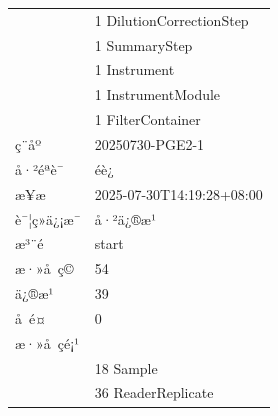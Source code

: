 \documentclass[UTF8,10pt,a4paper,fontset=fandol]{ctexart}
\newcommand{\fieldvalue}[1]{#1}
\begin{document}
\begin{tabular}{ll}
&
\fieldvalue{1}\quad
\fieldvalue{DilutionCorrectionStep}\\
&
\fieldvalue{1}\quad
\fieldvalue{SummaryStep}\\
&
\fieldvalue{1}\quad
\fieldvalue{Instrument}\\
&
\fieldvalue{1}\quad
\fieldvalue{InstrumentModule}\\
&
\fieldvalue{1}\quad
\fieldvalue{FilterContainer}\\[2pt]

ç¨åº &
\fieldvalue{20250730-PGE2-1}\\
å·²éªè¯ &
\fieldvalue{éè¿}\\
æ¥æ &
\fieldvalue{2025-07-30T14:19:28+08:00}\\
è¯¦ç»ä¿¡æ¯ &
\fieldvalue{å·²ä¿®æ¹}\\
æ³¨é &
\fieldvalue{start}\\[2pt]

æ·»å ç© &
\fieldvalue{54}\\
ä¿®æ¹ &
\fieldvalue{39}\\
å é¤ &
\fieldvalue{0}\\[2pt]

\multicolumn{2}{l}{æ·»å çé¡¹}\\
&
\fieldvalue{18}\quad
\fieldvalue{Sample}\\
&
\fieldvalue{36}\quad
\fieldvalue{ReaderReplicate}\\[2pt]


\end{tabular}
\end{document}
